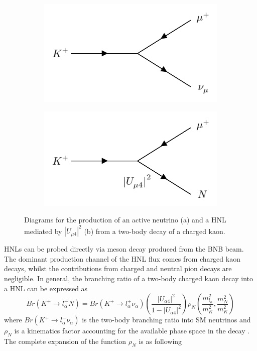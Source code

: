 \begin{figure}[htbp!]
\begin{subfigure}[h]{0.4\linewidth}
\centering    
\includegraphics[width=\linewidth]{K_to_nu}
\caption{}
\end{subfigure}
\hfill
\begin{subfigure}[h]{0.4\linewidth}
\centering    
\includegraphics[width=\linewidth]{K_to_HNL}
\caption{}
\end{subfigure}%
\caption[kaonDiagram]{
Diagrams for the production of an active neutrino (a) and a HNL mediated by $|U_{\mu4}|^{2}$ (b) from a two-body decay of a charged kaon.
}\label{fig:kaonDiagram}
\end{figure}

HNLs can be probed directly via meson decay produced from the BNB beam.
The dominant production channel of the HNL flux comes from charged kaon decays, whilst the contributions from charged and neutral pion decays are negligible. 
In general, the branching ratio of a two-body charged kaon decay into a HNL can be expressed as 
\begin{equation}
	Br(K^{+}\rightarrow l^{+}_{\alpha}N) = Br(K^{+}\rightarrow l^{+}_{\alpha}\nu_{\alpha})\left(\frac{|U_{\alpha 4}|^{2}}{1 - |U_{\alpha 4}|^{2}}\right)\rho_{N}\left(\frac{m^{2}_{l_{\alpha}}}{m^{2}_{K}}, \frac{m^{2}_{N}}{m^{2}_{K}} \right) 
\end{equation}
where $Br(K^{+}\rightarrow l^{+}_{\alpha}\nu_{\alpha})$ is the two-body branching ratio into SM neutrinos and $\rho_{N}$ is a kinematics factor accounting for the available phase space in the decay \cite{}. The complete expansion of the function $\rho_{N}$ is as following

